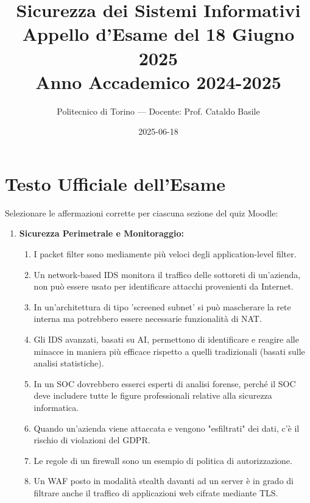 \documentclass[11pt,a4paper]{article}
\begin{document}
\title{\textbf{Sicurezza dei Sistemi Informativi} \\ \large Appello d'Esame del 18 Giugno 2025 \\ \small Anno Accademico 2024-2025}
\author{Politecnico di Torino --- Docente: Prof. Cataldo Basile}
\date{2025-06-18}
\maketitle


\section{Testo Ufficiale dell'Esame}

\begin{questionbox}
Selezionare le affermazioni corrette per ciascuna sezione del quiz Moodle:
\begin{enumerate}[label=\textbf{1.\arabic*}]
    \item \textbf{Sicurezza Perimetrale e Monitoraggio:}
    \begin{enumerate}[label=\alph*.]
        \item I packet filter sono mediamente pi\`u veloci degli application-level filter.
        \item Un network-based IDS monitora il traffico delle sottoreti di un'azienda, non pu\`o essere usato per identificare attacchi provenienti da Internet.
        \item In un'architettura di tipo 'screened subnet' si pu\`o mascherare la rete interna ma potrebbero essere necessarie funzionalit\`a di NAT.
        \item Gli IDS avanzati, basati su AI, permettono di identificare e reagire alle minacce in maniera pi\`u efficace rispetto a quelli tradizionali (basati sulle analisi statistiche).
        \item In un SOC dovrebbero esserci esperti di analisi forense, perch\'e il SOC deve includere tutte le figure professionali relative alla sicurezza informatica.
        \item Quando un'azienda viene attaccata e vengono "esfiltrati" dei dati, c'\`e il rischio di violazioni del GDPR.
        \item Le regole di un firewall sono un esempio di politica di autorizzazione.
        \item Un WAF posto in modalit\`a stealth davanti ad un server \`e in grado di filtrare anche il traffico di applicazioni web cifrate mediante TLS.
    \end{enumerate}


\end{enumerate}
\end{questionbox}
\end{document}
